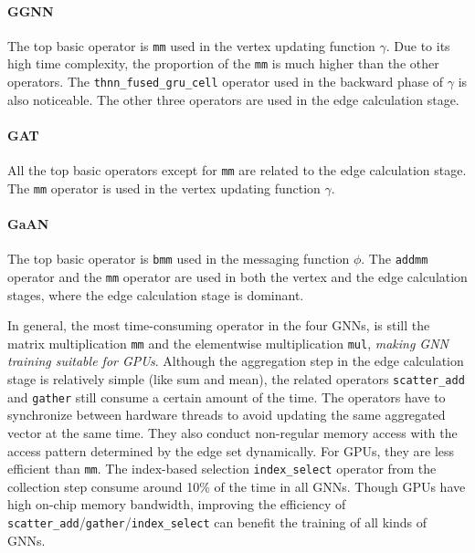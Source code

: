 \paragraph{GGNN}
The top basic operator is \texttt{mm} used in the vertex updating function $\gamma$.
Due to its high time complexity, the proportion of the \texttt{mm} is much higher than the other operators.
The \texttt{thnn\_fused\_gru\_cell} operator used in the backward phase of $\gamma$ is also noticeable.
The other three operators are used in the edge calculation stage.

\paragraph{GAT}
All the top basic operators except for \texttt{mm} are related to the edge calculation stage.
The \texttt{mm} operator is used in the vertex updating function $\gamma$.

\paragraph{GaAN}
The top basic operator is \texttt{bmm} used in the messaging function $\phi$.
The \texttt{addmm} operator and the \texttt{mm} operator are used in both the vertex and the edge calculation stages, where the edge calculation stage is dominant.

In general, the most time-consuming operator in the four GNNs, is still the matrix multiplication \texttt{mm} and the elementwise multiplication \texttt{mul}, \emph{making GNN training suitable for GPUs}.
Although the aggregation step in the edge calculation stage is relatively simple (like sum and mean), the related operators \texttt{scatter\_add} and \texttt{gather} still consume a certain amount of the time.
The operators have to synchronize between hardware threads to avoid updating the same aggregated vector at the same time. They also conduct non-regular memory access with the access pattern determined by the edge set dynamically.
For GPUs, they are less efficient than \texttt{mm}.
The index-based selection \texttt{index\_select} operator from the collection step consume around 10\% of the time in all GNNs.
Though GPUs have high on-chip memory bandwidth, improving the efficiency of \texttt{scatter\_add}/\texttt{gather}/\texttt{index\_select} can benefit the training of all kinds of GNNs.

